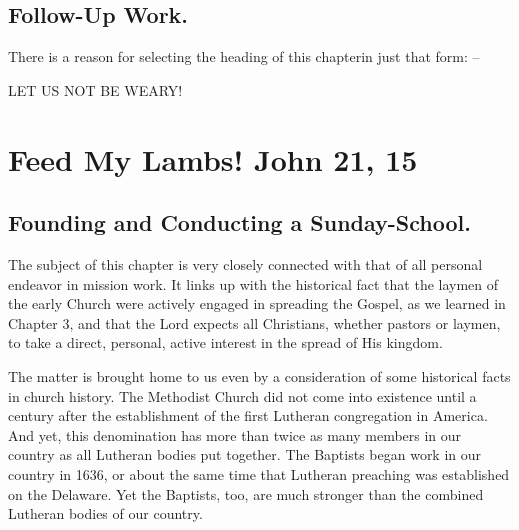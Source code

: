 \documentclass[
]{book}
\begin{document}
\hypertarget{follow-up-work.}{%
\section*{Follow-Up Work.}\label{follow-up-work.}}

There is a reason for selecting the heading of this chapterin just that form: --

LET US NOT BE WEARY!

\hypertarget{feed-my-lambs-john-21-15}{%
\chapter{Feed My Lambs! John 21, 15}\label{feed-my-lambs-john-21-15}}

\hypertarget{founding-and-conducting-a-sunday-school.}{%
\section*{Founding and Conducting a Sunday-School.}\label{founding-and-conducting-a-sunday-school.}}

The subject of this chapter is very closely connected with that of all personal endeavor in mission work. It links up with the historical fact that the laymen of the early Church were actively engaged in spreading the Gospel, as we learned in Chapter 3, and that the Lord expects all Christians, whether pastors or laymen, to take a direct, personal, active interest in the spread of His kingdom.

The matter is brought home to us even by a consideration of some historical facts in church history. The Methodist Church did not come into existence until a century after the establishment of the first Lutheran congregation in America. And yet, this denomination has more than twice as many members in our country as all Lutheran bodies put together. The Baptists began work in our country in 1636, or about the same time that Lutheran preaching was established on the Delaware. Yet the Baptists, too, are much stronger than the combined Lutheran bodies of our country.
\end{document}

